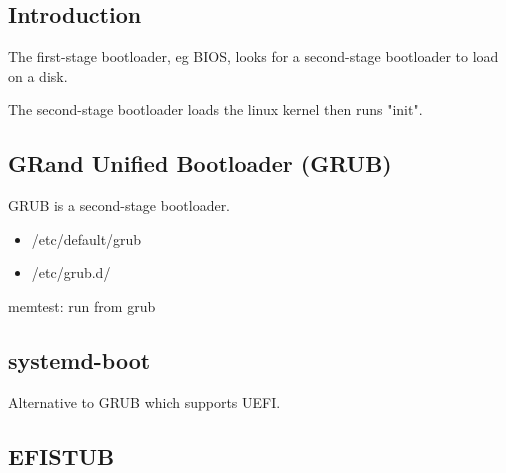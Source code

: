 
\subsection{Introduction}

The first-stage bootloader, eg BIOS, looks for a second-stage bootloader to load on a disk.

The second-stage bootloader loads the linux kernel then runs "init".

\subsection{GRand Unified Bootloader (GRUB)}

GRUB is a second-stage bootloader.

\begin{itemize}
  \item /etc/default/grub
  \item /etc/grub.d/
\end{itemize}

memtest: run from grub

\subsection{systemd-boot}

Alternative to GRUB which supports UEFI.

\subsection{EFISTUB}

